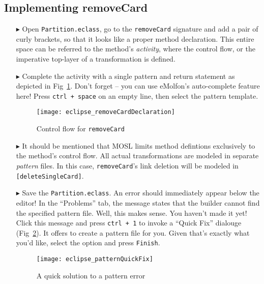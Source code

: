 \newpage
\hypertarget{remCard tex}{}
\subsection{Implementing removeCard}
\texHeader

\begin{itemize}

\item[$\blacktriangleright$] Open \texttt{Partition.eclass}, go to the \texttt{removeCard} signature and add a pair of curly brackets, so that it looks like a
proper method declaration. This entire space can be referred to the method's \emph{activity}, where the control flow, or the imperative top-layer of a
transformation is defined.

\item[$\blacktriangleright$] Complete the activity with a single pattern and return statement as depicted in Fig~\ref{fig:remCardDec}. Don't forget -- you can
use eMolfon's auto-complete feature here! Press \texttt{ctrl + space} on an empty line, then select the pattern template.

\begin{figure}[htp]
\begin{center}
  \texttt{[image: eclipse\_removeCardDeclaration]}
  \caption{Control flow for \texttt{removeCard}}
  \label{fig:remCardDec}
\end{center}
\end{figure}

\item[$\blacktriangleright$] It should be mentioned that MOSL limits method defintions exclusively to the method's control flow. All actual transformations are
modeled in separate \emph{pattern} files. In this case, \texttt{removeCard}'s link deletion will be modeled in \texttt{[deleteSingleCard]}.

\item[$\blacktriangleright$] Save the \texttt{Partition.eclass}. An error should immediately appear below the editor! In the ``Problems'' tab, the message
states that the builder cannot find the specified pattern file. Well, this makes sense. You haven't made it yet! Click this message and press \texttt{ctrl + 1}
to invoke a ``Quick Fix'' dialouge (Fig~\ref{fig:quixFix}). It offers to create a pattern file for you. Given that's exactly what you'd like, select the option
and press \texttt{Finish}.

\begin{figure}[htp]
\begin{center}
  \texttt{[image: eclipse\_patternQuickFix]}
  \caption{A quick solution to a pattern error}
  \label{fig:quixFix}
\end{center}
\end{figure}


\end{itemize}
